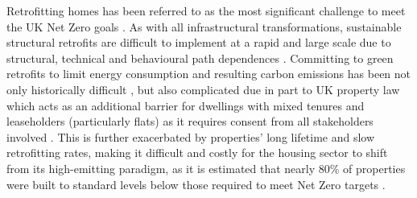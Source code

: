 Retrofitting homes has been referred to as the most significant challenge to meet the UK Net Zero goals  \cite{alabid_review_2022, uk_green_building_council_ukgbc_retrofit_2021}. As with all infrastructural transformations, sustainable structural retrofits are difficult to implement at a rapid and large scale due to structural, technical and behavioural path dependences \cite{dauda_understanding_2022}. Committing to green retrofits to limit energy consumption and resulting carbon emissions has been not only historically difficult \cite{lowe_technical_2007, chaves_building_2017}, but also complicated due in part to UK property law which acts as an additional barrier for dwellings with mixed tenures and leaseholders (particularly flats) as it requires consent from all stakeholders involved \cite{weatherall_property_2018, bright_exploring_2019}. This is further exacerbated by properties' long lifetime and slow retrofitting rates, making it difficult and costly for the housing sector to shift from its high-emitting paradigm, as it is estimated that nearly 80\% of properties were built to standard levels below those required to meet  Net Zero targets \cite{warren_can_2024, uk_green_building_council_ukgbc_retrofit_2021}. \\

